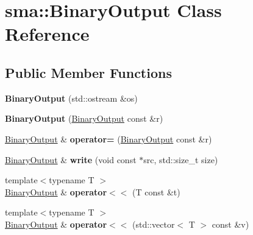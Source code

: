 \hypertarget{classsma_1_1BinaryOutput}{\section{sma\-:\-:Binary\-Output Class Reference}
\label{classsma_1_1BinaryOutput}
}
\subsection*{Public Member Functions}
\begin{DoxyCompactItemize}
\item 
\hypertarget{classsma_1_1BinaryOutput_a0e7daf442b1f76ca0d919b01555f4abd}{{\bfseries Binary\-Output} (std\-::ostream \&os)}\label{classsma_1_1BinaryOutput_a0e7daf442b1f76ca0d919b01555f4abd}

\item 
\hypertarget{classsma_1_1BinaryOutput_a35fc0b2957c844399c3352c18d99fa70}{{\bfseries Binary\-Output} (\hyperlink{classsma_1_1BinaryOutput}{Binary\-Output} const \&r)}\label{classsma_1_1BinaryOutput_a35fc0b2957c844399c3352c18d99fa70}

\item 
\hypertarget{classsma_1_1BinaryOutput_a41fdb48541cdd9ee3e15ef8a8641c68e}{\hyperlink{classsma_1_1BinaryOutput}{Binary\-Output} \& {\bfseries operator=} (\hyperlink{classsma_1_1BinaryOutput}{Binary\-Output} const \&r)}\label{classsma_1_1BinaryOutput_a41fdb48541cdd9ee3e15ef8a8641c68e}

\item 
\hypertarget{classsma_1_1BinaryOutput_a1e51af2a691dba26e8d72facd1831c97}{\hyperlink{classsma_1_1BinaryOutput}{Binary\-Output} \& {\bfseries write} (void const $\ast$src, std\-::size\-\_\-t size)}\label{classsma_1_1BinaryOutput_a1e51af2a691dba26e8d72facd1831c97}

\item 
\hypertarget{classsma_1_1BinaryOutput_a98e9262d27c0b53d975e1b3708102073}{{\footnotesize template$<$typename T $>$ }\\\hyperlink{classsma_1_1BinaryOutput}{Binary\-Output} \& {\bfseries operator$<$$<$} (T const \&t)}\label{classsma_1_1BinaryOutput_a98e9262d27c0b53d975e1b3708102073}

\item 
\hypertarget{classsma_1_1BinaryOutput_a9b8b2919814081b98cc76beb5eeeb979}{{\footnotesize template$<$typename T $>$ }\\\hyperlink{classsma_1_1BinaryOutput}{Binary\-Output} \& {\bfseries operator$<$$<$} (std\-::vector$<$ T $>$ const \&v)}\label{classsma_1_1BinaryOutput_a9b8b2919814081b98cc76beb5eeeb979}


\end{DoxyCompactItemize}
